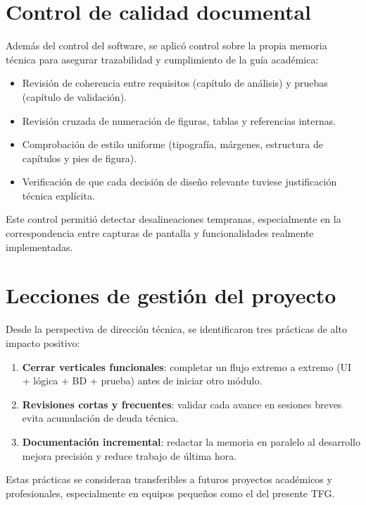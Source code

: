 \section{Control de calidad documental}

Además del control del software, se aplicó control sobre la propia memoria técnica para asegurar trazabilidad y cumplimiento de la guía académica:

\begin{itemize}
  \item Revisión de coherencia entre requisitos (capítulo de análisis) y pruebas (capítulo de validación).
  \item Revisión cruzada de numeración de figuras, tablas y referencias internas.
  \item Comprobación de estilo uniforme (tipografía, márgenes, estructura de capítulos y pies de figura).
  \item Verificación de que cada decisión de diseño relevante tuviese justificación técnica explícita.
\end{itemize}

Este control permitió detectar desalineaciones tempranas, especialmente en la correspondencia entre capturas de pantalla y funcionalidades realmente implementadas.

\section{Lecciones de gestión del proyecto}

Desde la perspectiva de dirección técnica, se identificaron tres prácticas de alto impacto positivo:

\begin{enumerate}
  \item \textbf{Cerrar verticales funcionales}: completar un flujo extremo a extremo (UI + lógica + BD + prueba) antes de iniciar otro módulo.
  \item \textbf{Revisiones cortas y frecuentes}: validar cada avance en sesiones breves evita acumulación de deuda técnica.
  \item \textbf{Documentación incremental}: redactar la memoria en paralelo al desarrollo mejora precisión y reduce trabajo de última hora.
\end{enumerate}

Estas prácticas se consideran transferibles a futuros proyectos académicos y profesionales, especialmente en equipos pequeños como el del presente TFG.
